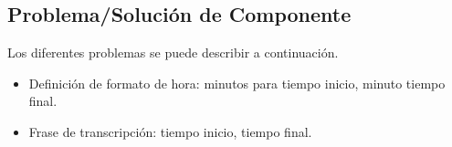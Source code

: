 \begin{itemize}
\end{itemize}

\subsection{Problema/Solución de Componente}

Los diferentes problemas se puede describir a continuación.
 
\begin{itemize}

\item Definición de formato de hora: minutos para tiempo inicio, minuto tiempo final.
\item Frase de transcripción: tiempo inicio, tiempo final.

\end{itemize}

